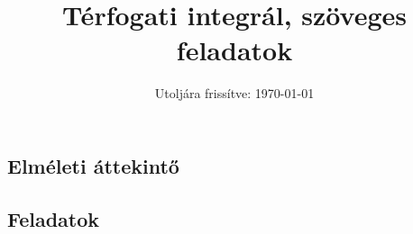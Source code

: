 \documentclass{szb-practice}
\title{Térfogati integrál, szöveges feladatok}
\date{Utoljára frissítve: \today}
\begin{document}
\allowdisplaybreaks

\maketitle

\vspace{-1em}
\subsection{Elméleti áttekintő}
\vspace{1em}

\clearpage
\subsection{Feladatok}
\end{document}

